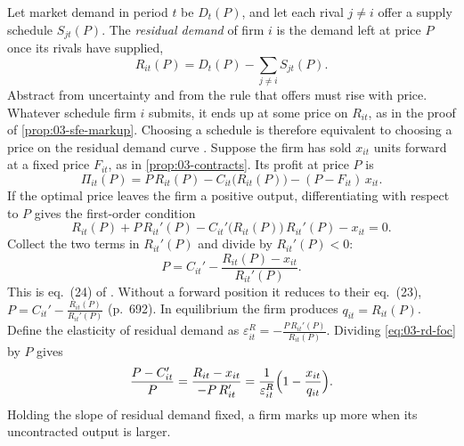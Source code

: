 Let market demand in period $t$ be $D_t(P)$, and let each rival $j \ne i$ offer a supply schedule $S_{jt}(P)$. The
\emph{residual demand} of firm $i$ is the demand left at price $P$ once its rivals have supplied,
\begin{equation}\label{eq:03-rd-elec}
R_{it}(P) = D_t(P) - \sum_{j \ne i} S_{jt}(P).
\end{equation}
Abstract from uncertainty and from the rule that offers must rise with price. Whatever schedule firm $i$ submits, it
ends up at some price on $R_{it}$, as in the proof of \cref{prop:03-sfe-markup}. Choosing a schedule is therefore
equivalent to choosing a price on the residual demand curve \citep[pp.~691--692]{KelloggReguant2021}. Suppose the
firm has sold $x_{it}$ units forward at a fixed price $F_{it}$, as in \cref{prop:03-contracts}. Its profit at price
$P$ is
\begin{equation*}
\Pi_{it}(P) = P\,R_{it}(P) - C_{it}\bigl(R_{it}(P)\bigr) - (P - F_{it})\,x_{it}.
\end{equation*}
If the optimal price leaves the firm a positive output, differentiating with respect to $P$ gives the first-order
condition
\begin{equation*}
R_{it}(P) + P\,R_{it}'(P) - C_{it}'\bigl(R_{it}(P)\bigr)\,R_{it}'(P) - x_{it} = 0 .
\end{equation*}
Collect the two terms in $R_{it}'(P)$ and divide by $R_{it}'(P) < 0$:
\begin{equation}\label{eq:03-rd-foc}
P = C_{it}' - \frac{R_{it}(P) - x_{it}}{R_{it}'(P)} .
\end{equation}
This is eq.~(24) of \citet[p.~694]{KelloggReguant2021}. Without a forward position it reduces to their eq.~(23),
$P = C_{it}' - \frac{R_{it}(P)}{R_{it}'(P)}$ (p.~692). In equilibrium the firm produces $q_{it} = R_{it}(P)$. Define
the elasticity of residual demand as $\varepsilon^R_{it} = -\frac{P\,R_{it}'(P)}{R_{it}(P)}$. Dividing
\eqref{eq:03-rd-foc} by $P$ gives
\begin{equation}\label{eq:03-rd-lerner}
\frac{P - C_{it}'}{P} = \frac{R_{it} - x_{it}}{-P\,R_{it}'}
= \frac{1}{\varepsilon^R_{it}}\Bigl(1 - \frac{x_{it}}{q_{it}}\Bigr).
\end{equation}
Holding the slope of residual demand fixed, a firm marks up more when its uncontracted output is larger.

